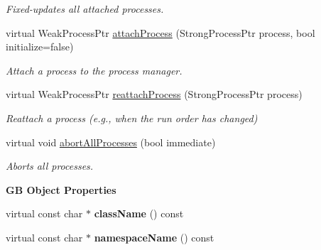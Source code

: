 \begin{Indent}
\begin{DoxyCompactItemize}
\begin{DoxyCompactList}\small\item\em Fixed-\/updates all attached processes. \end{DoxyCompactList}\item 
\mbox{\label{classrev_1_1_process_queue_a65c9d6fdcd1fbb49f9ec53206a3b9654}} 
virtual Weak\+Process\+Ptr \mbox{\hyperlink{classrev_1_1_process_queue_a65c9d6fdcd1fbb49f9ec53206a3b9654}{attach\+Process}} (Strong\+Process\+Ptr process, bool initialize=false)
\begin{DoxyCompactList}\small\item\em Attach a process to the process manager. \end{DoxyCompactList}\item 
\mbox{\label{classrev_1_1_process_queue_a6b9a2b519b15b6ec721b4c9b5dfe03dc}} 
virtual Weak\+Process\+Ptr \mbox{\hyperlink{classrev_1_1_process_queue_a6b9a2b519b15b6ec721b4c9b5dfe03dc}{reattach\+Process}} (Strong\+Process\+Ptr process)
\begin{DoxyCompactList}\small\item\em Reattach a process (e.\+g., when the run order has changed) \end{DoxyCompactList}\item 
\mbox{\label{classrev_1_1_process_queue_a69626d3a6851997fca819d211f898b5a}} 
virtual void \mbox{\hyperlink{classrev_1_1_process_queue_a69626d3a6851997fca819d211f898b5a}{abort\+All\+Processes}} (bool immediate)
\begin{DoxyCompactList}\small\item\em Aborts all processes. \end{DoxyCompactList}\end{DoxyCompactItemize}
\end{Indent}
\begin{Indent}\textbf{ GB Object Properties}\par
\begin{DoxyCompactItemize}
\item 
\mbox{\label{classrev_1_1_process_queue_aff7445e9d9aac2c502f9e2ed849fc150}} 
virtual const char $\ast$ {\bfseries class\+Name} () const
\item 
\mbox{\label{classrev_1_1_process_queue_af4c0e49e9cdee2c64ba71506d340f024}} 
virtual const char $\ast$ {\bfseries namespace\+Name} () const
\end{DoxyCompactItemize}
\end{Indent}
